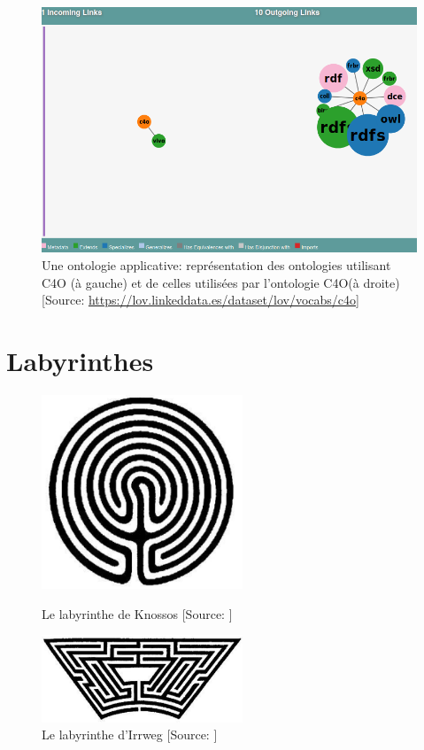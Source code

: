\begin{figure}[!h]
	\centering
	\includegraphics[width=14cm]{images/onto_c4o.png}
	\caption[Une ontologie applicative: C4O]{Une ontologie applicative: représentation des ontologies utilisant C4O (à gauche) et de celles utilisées par l'ontologie C4O(à droite) [Source: \url{https://lov.linkeddata.es/dataset/lov/vocabs/c4o}]}
	\label{onto_c4o}
\end{figure}

\chapter{\label{annexe_laby}Labyrinthes}

\begin{figure}[!h]
	\centering
	\begin{minipage}[c]{.46\linewidth}
		\includegraphics[width=6cm]{images/laby_knossos.png}
		\caption[Le labyrinthe de Knossos]{Le labyrinthe de Knossos [Source: \cite[ch. 1.5]{eco_arbre_2010}]}
		\label{laby_knossos}
	\end{minipage}
	\begin{minipage}[c]{.46\linewidth}
		\includegraphics[width=6cm]{images/laby_irrweg.png}
		\caption[Le labyrinthe d'Irrweg]{Le labyrinthe d'Irrweg [Source: \cite[ch. 1.5]{eco_arbre_2010}]}
		\label{laby_irrweg}
\end{minipage}
\end{figure}

